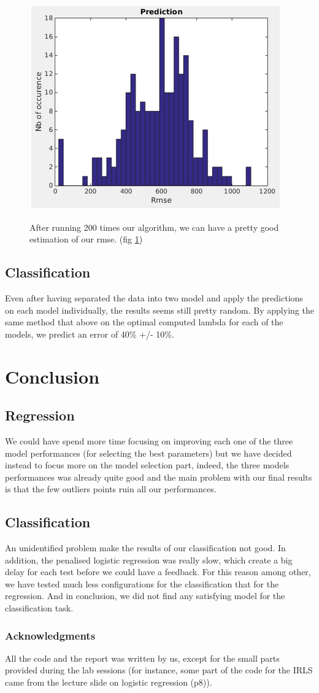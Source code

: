 \documentclass{article} %
\begin{document}
\begin{figure}[!h]
\center
{\includegraphics{figures/histPred.png} \label{fig:histPred}}
\caption{After running 200 times our algorithm, we can have a pretty good estimation of our rmse. (fig \ref{fig:histPred})}
\end{figure}

\subsection{Classification}

Even after having separated the data into two model and apply the predictions on each model individually, the results seems still pretty random. By applying the same method that above on the optimal computed lambda for each of the models, we predict an error of 40\% +/- 10\%.

\section{Conclusion}
\subsection{Regression}
We could have spend more time focusing on improving each one of the three model performances (for selecting the best parameters) but we have decided instead to focus more on the model selection part, indeed, the three models performances was already quite good and the main problem with our final results is that the few outliers points ruin all our performances.

\subsection{Classification}
An unidentified problem make the results of our classification not good. In addition, the penalised logistic regression was really slow, which create a big delay for each test before we could have a feedback. For this reason among other, we have tested much less configurations for the classification that for the regression. And in conclusion, we did not find any satisfying model for the classification task.

\subsubsection*{Acknowledgments}
All the code and the report was written by us, except for the small parts provided during the lab sessions (for instance, some part of the code for the IRLS came from the lecture slide on logistic regression (p8)).
\end{document}
